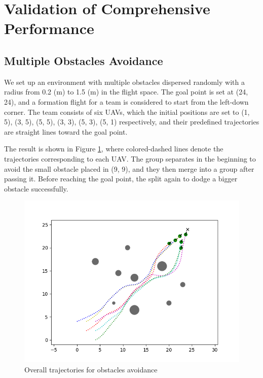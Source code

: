 \section{Validation of Comprehensive Performance}
\subsection{Multiple Obstacles Avoidance}
We set up an environment with multiple obstacles dispersed randomly with a radius from 0.2 (m) to 1.5 (m) in the flight space. The goal point is set at (24, 24), and a formation flight for a team is considered to start from the left-down corner. The team consists of six UAVs, which the initial positions are set to (1, 5), (3, 5), (5, 5), (3, 3), (5, 3), (5, 1) respectively, and their predefined trajectories are straight lines toward the goal point.

The result is shown in Figure \ref{fig:trajectory}, where colored-dashed lines denote the trajectories corresponding to each UAV. The group separates in the beginning to avoid the small obstacle placed in (9, 9), and they then merge into a group after passing it. Before reaching the goal point, the split again to dodge a bigger obstacle successfully.

\begin{figure}[H]
    \centering
    \includegraphics[scale=0.7]{figures/exp1-3.png}
    \caption{Overall trajectories for obstacles avoidance}
    \label{fig:trajectory}
\end{figure}

